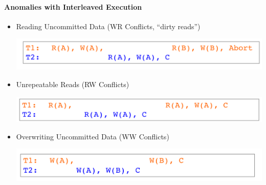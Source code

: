 \paragraph{Anomalies with Interleaved Execution}
\begin{itemize}
\item Reading Uncommitted Data (WR Conflicts, ``dirty reads'')

  \includegraphics[scale=0.15]{graphics/WR-conflicts.png}

\item Unrepeatable Reads (RW Conflicts)

  \includegraphics[scale=0.15]{graphics/RW-conflicts.png}

\item Overwriting Uncommitted Data (WW Conflicts)

  \includegraphics[scale=0.15]{graphics/WW-conflicts.png}
\end{itemize}

